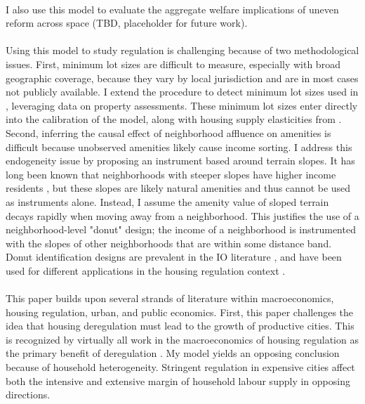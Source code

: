 \documentclass[]{article}
\begin{document}
	\paragraph*{}
	I also use this model to evaluate the aggregate welfare implications of uneven reform across space (TBD, placeholder for future work). 
	
	\paragraph*{}
	Using this model to study regulation is challenging because of two methodological issues. First, minimum lot sizes are difficult to measure, especially with broad geographic coverage, because they vary by local jurisdiction and are in most cases not publicly available. I extend the procedure to detect minimum lot sizes used in \cite{Song}, leveraging data on property assessments. These minimum lot sizes enter directly into the calibration of the model, along with housing supply elasticities from \cite{BSH}. Second, inferring the causal effect of neighborhood affluence on amenities is difficult because unobserved amenities likely cause income sorting. I address this endogeneity issue by proposing an instrument based around terrain slopes. It has long been known that neighborhoods with steeper slopes have higher income residents \citep{saiz2010}, but these slopes are likely natural amenities and thus cannot be used as instruments alone. Instead, I assume the amenity value of sloped terrain decays rapidly when moving away from a neighborhood. This justifies the use of a neighborhood-level "donut" design; the income of a neighborhood is instrumented with the slopes of other neighborhoods that are within some distance band. Donut identification designs are prevalent in the IO literature \citep{BFMJPE}, and have been used for different applications in the housing regulation context \citep{anagoletal2021, kulka}.

	\paragraph*{}
	This paper builds upon several strands of literature within  macroeconomics, housing regulation, urban, and public economics. First, this paper challenges the idea that housing deregulation must lead to the growth of productive cities. This is recognized by virtually all work in the macroeconomics of housing regulation as the primary benefit of deregulation \citep{hseihmoretti, durantonpugaurbgrowth, parkho, hop, bunten}. My model yields an opposing conclusion because of household heterogeneity. Stringent regulation in expensive cities affect both the intensive and extensive margin of household labour supply in opposing directions. 
	
\end{document}
